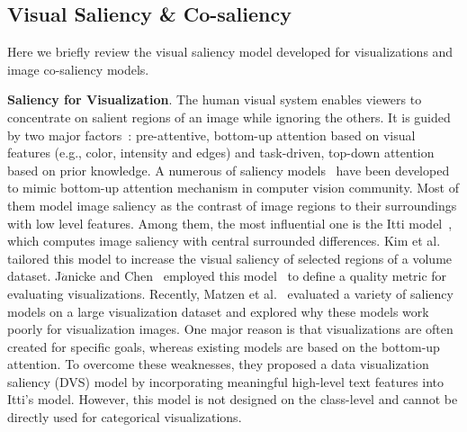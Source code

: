 \subsection{Visual Saliency \& Co-saliency}
Here we briefly review the visual saliency model developed for visualizations and image co-saliency models.

\vspace{1.5mm}
\noindent\textbf{Saliency for Visualization}.
The human visual system enables viewers to concentrate on salient regions of an image while ignoring the others. It is guided by two major factors~\cite{connor2004visual}: pre-attentive, bottom-up attention based on visual features (e.g., color, intensity and edges) and task-driven, top-down attention based on prior knowledge. %
A numerous of saliency models~\cite{borji2019salient} have been developed to mimic bottom-up attention mechanism in computer vision community.
Most of them model image saliency as the contrast of image regions to their surroundings with low level features. Among them, the most influential one is the Itti model~\cite{Itti98}, which computes image saliency with central surrounded differences. Kim et al.~\cite{Kim06} tailored this model to increase the visual saliency of selected regions of a volume dataset.  J$\ddot{a}$nicke and Chen~\cite{Janicke10} employed this model~\cite{Itti98} to define a quality metric for evaluating visualizations.
Recently, Matzen et al.~\cite{Matzen18} evaluated a variety of saliency models on a large visualization dataset and explored why these models work poorly for visualization images. One major reason is that visualizations are often created for specific goals, whereas existing models are based on the bottom-up attention. To overcome these weaknesses, they proposed a data visualization saliency (DVS) model by incorporating meaningful high-level text features into Itti's model. However, this model is not designed on the class-level and cannot be directly used for categorical visualizations.



